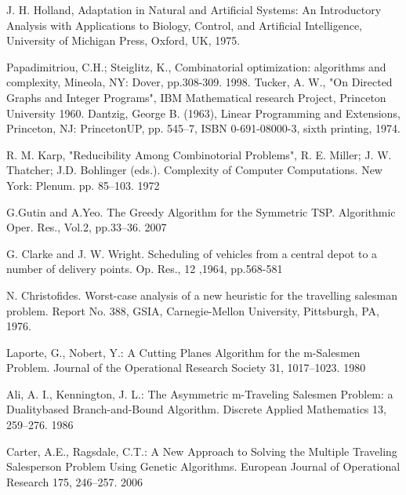 \documentclass[11pt]{article}
\begin{document}
\begin{thebibliography}{10}
  J. H. Holland,
  Adaptation in Natural and Artificial Systems: An
Introductory Analysis with Applications to Biology, Control, and
Artificial Intelligence, University of Michigan Press, Oxford, UK,
1975.

 Papadimitriou, C.H.; Steiglitz, K., Combinatorial optimization: algorithms and complexity, Mineola, NY: Dover, pp.308-309.
1998.
 Tucker, A. W., "On Directed Graphs and Integer Programs", IBM Mathematical research Project, Princeton University
1960.
 Dantzig, George B. (1963), Linear Programming and Extensions, Princeton, NJ: PrincetonUP, pp. 545–7, ISBN 0-691-08000-3, sixth printing, 1974.

R. M. Karp, "Reducibility Among Combinotorial Problems", R. E. Miller; J. W. Thatcher; J.D. Bohlinger (eds.). Complexity of Computer Computations. New York: Plenum. pp. 85–103. 1972

 G.Gutin and A.Yeo. The Greedy Algorithm for the Symmetric TSP. Algorithmic Oper. Res., Vol.2, pp.33--36. 2007

 G. Clarke and J. W. Wright. Scheduling of vehicles from a central depot to a number of delivery points. Op. Res., 12 ,1964, pp.568-581

  N. Christofides. Worst-case analysis of a new heuristic for the travelling salesman problem. Report No. 388, GSIA, Carnegie-Mellon University, Pittsburgh, PA, 1976.

Laporte, G., Nobert, Y.: A Cutting Planes Algorithm for the m-Salesmen Problem. Journal of the Operational Research Society 31, 1017–1023. 1980

Ali, A. I., Kennington, J. L.: The Asymmetric m-Traveling Salesmen Problem: a Dualitybased Branch-and-Bound Algorithm. Discrete Applied Mathematics 13, 259–276. 1986

Carter, A.E., Ragsdale, C.T.: A New Approach to Solving the Multiple Traveling Salesperson Problem Using Genetic Algorithms. European Journal of Operational Research 175, 246–257. 2006

\end{thebibliography}
\end{document}
